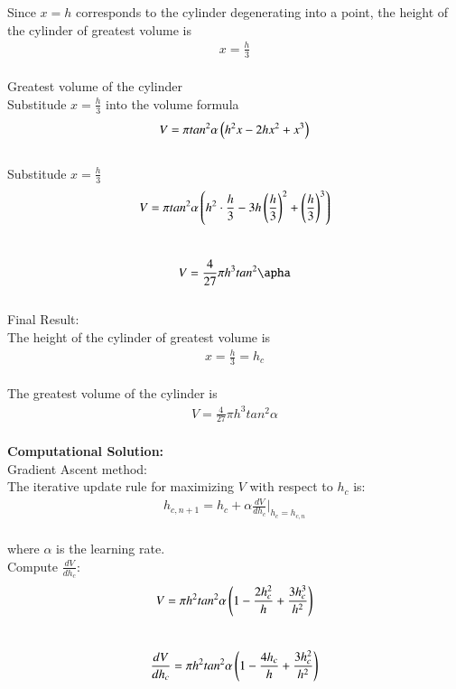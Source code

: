 \documentclass[journal]{IEEEtran}
\begin{document}
Since $x=h$ corresponds to the cylinder degenerating into a point, the height of the cylinder of greatest volume is
\begin{align}
    x=\frac{h}{3}
\end{align}\\
Greatest volume of the cylinder\\
Substitude $x=\frac{h}{3}$ into the volume formula
\begin{align}
    V=\pi tan^{2}\alpha\left(h^{2}x-2hx^{2}+x^{3}\right)
\end{align}\\
Substitude $x=\frac{h}{3}$
\begin{align}
 V=\pi tan^{2}\alpha\left(h^{2}\cdot\frac{h}{3}-3h\left(\frac{h}{3}\right)^{2}+\left(\frac{h}{3}\right)^{3}\right)
\end{align}\\
\begin{align}
    V=\frac{4}{27}\pi h^{3}tan^{2}\apha
\end{align}\\
Final Result:\\
The height of the cylinder of greatest volume is
\begin{align}
    x=\frac{h}{3}=h_{c}
\end{align}\\
The greatest volume of the cylinder is
\begin{align}
V=\frac{4}{27}\pi h^{3}tan^{2}\alpha
\end{align}\\
 \textbf{Computational Solution:}\\
 Gradient Ascent method:\\
 The iterative update rule for maximizing $V$ with respect to $h_{c}$ is:
 \begin{align}
     h_{c,n+1}=h_{c}+\alpha\frac{dV}{dh_{c}}\big|_{h_{c}=h_{c,n}}
 \end{align}\\
 where $\alpha$ is the learning rate.\\
 Compute $\frac{dV}{dh_{c}}$:\\
 \begin{align}
     V=\pi h^{2}tan^{2}\alpha\left(1-\frac{2h^{2}_{c}}{h}+\frac{3h^{3}_{c}}{h^{2}}\right)
 \end{align}\\
 \begin{align}
     \frac{dV}{dh_{c}}=\pi h^{2}tan^{2}\alpha\left(1-\frac{4h_{c}}{h}+\frac{3h^{2}_{c}}{h^{2}}\right)
 \end{align}\\
\end{document}
